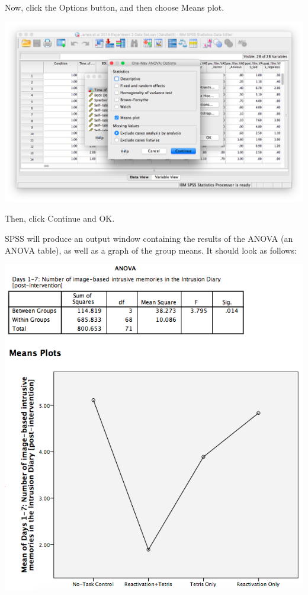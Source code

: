 \documentclass[
]{book}
\begin{document}
Now, click the {Options} button, and then choose {Means plot}.

\includegraphics{img/8.4.14.png}

Then, click {Continue} and {OK}.

SPSS will produce an output window containing the results of the ANOVA (an ANOVA table), as well as a graph of the group means. It should look as follows:

\includegraphics{img/8.4.15.png}
\end{document}
